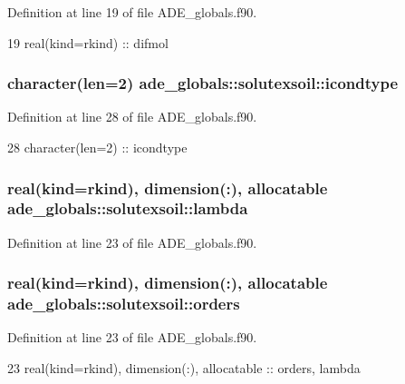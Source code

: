 Definition at line 19 of file A\+D\+E\+\_\+globals.\+f90.


\begin{DoxyCode}
19     \textcolor{keywordtype}{real(kind=rkind)} :: difmol
\end{DoxyCode}
\subsubsection[{icondtype}]{\setlength{\rightskip}{0pt plus 5cm}character(len=2) ade\+\_\+globals\+::solutexsoil\+::icondtype}\label{structade__globals_1_1solutexsoil_a373e3f1f5ef13186edc84695b5cf29c8}


Definition at line 28 of file A\+D\+E\+\_\+globals.\+f90.


\begin{DoxyCode}
28     \textcolor{keywordtype}{character(len=2)} :: icondtype
\end{DoxyCode}
\subsubsection[{lambda}]{\setlength{\rightskip}{0pt plus 5cm}real(kind=rkind), dimension(\+:), allocatable ade\+\_\+globals\+::solutexsoil\+::lambda}\label{structade__globals_1_1solutexsoil_a50a86a8fc08d79943f9dd8f60407d453}


Definition at line 23 of file A\+D\+E\+\_\+globals.\+f90.

\subsubsection[{orders}]{\setlength{\rightskip}{0pt plus 5cm}real(kind=rkind), dimension(\+:), allocatable ade\+\_\+globals\+::solutexsoil\+::orders}\label{structade__globals_1_1solutexsoil_a6cdccfc4824f33dd883baf67f0810143}


Definition at line 23 of file A\+D\+E\+\_\+globals.\+f90.


\begin{DoxyCode}
23     \textcolor{keywordtype}{real(kind=rkind)}, \textcolor{keywordtype}{dimension(:)}, \textcolor{keywordtype}{allocatable} :: orders, lambda 
\end{DoxyCode}
